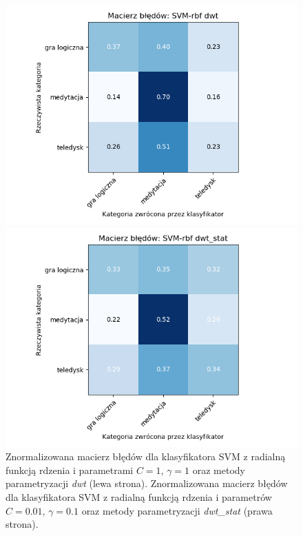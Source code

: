 \documentclass[notitlepage]{report}
\begin{document}
\begin{figure}[H]
	\begin{minipage}{0.48\textwidth}
		\centering
		\includegraphics[width=1.3\linewidth]{rbf_svm_dwt_cm.png}
	\end{minipage}
	\begin{minipage}{0.48\textwidth}
		\centering
		\includegraphics[width=1.3\linewidth]{rbf_svm_dwt_2_cm.png}
	\end{minipage}
	\caption{Znormalizowana macierz błędów dla klasyfikatora SVM z radialną funkcją rdzenia i parametrami $C=1$, $\gamma=1$ oraz metody parametryzacji \textit{dwt} (lewa strona). Znormalizowana macierz błędów dla klasyfikatora SVM z radialną funkcją rdzenia i parametrów $C=0.01$, $\gamma=0.1$ oraz metody parametryzacji \textit{dwt\_stat} (prawa strona).}
\end{figure}
\end{document}
